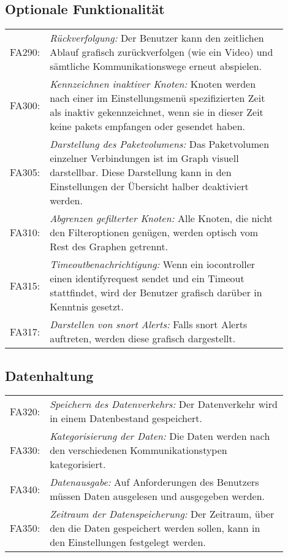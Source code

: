\subsection{Optionale Funktionalität}
\begin{tabular}{lp{0.9\linewidth}}

FA290: & \textit{Rückverfolgung: }Der Benutzer kann den zeitlichen Ablauf grafisch zurückverfolgen (wie ein Video) und sämtliche Kommunikationswege erneut abspielen. \\

FA300: & \textit{Kennzeichnen inaktiver Knoten: }Knoten werden nach einer im Einstellungsmenü spezifizierten Zeit als inaktiv gekennzeichnet, wenn sie in dieser Zeit keine \glspl{paket} empfangen oder gesendet haben. \\

FA305: & \textit{Darstellung des Paketvolumens: }Das Paketvolumen einzelner Verbindungen ist im Graph visuell darstellbar. Diese Darstellung kann in den Einstellungen der Übersicht halber deaktiviert werden. \\

FA310: & \textit{Abgrenzen gefilterter Knoten: }Alle Knoten, die nicht den Filteroptionen genügen, werden optisch vom Rest des Graphen getrennt. \\

FA315: & \textit{Timeoutbenachrichtigung: }Wenn ein \gls{iocontroller} einen \gls{identifyrequest} sendet und ein Timeout stattfindet, wird der Benutzer grafisch darüber in Kenntnis gesetzt.\\

FA317: & \textit{Darstellen von \gls{snort} Alerts: }Falls \gls{snort} Alerts auftreten, werden diese grafisch dargestellt.

\end{tabular}

\subsection{Datenhaltung}

\begin{tabular}{lp{0.9\linewidth}}

FA320: & \textit{Speichern des Datenverkehrs: }Der Datenverkehr wird in einem Datenbestand gespeichert. \\

FA330: & \textit{Kategorisierung der Daten: }Die Daten werden nach den verschiedenen Kommunikationstypen kategorisiert. \\

FA340: & \textit{Datenausgabe: }Auf Anforderungen des Benutzers müssen Daten ausgelesen und ausgegeben werden. \\

FA350: & \textit{Zeitraum der Datenspeicherung: }Der Zeitraum, über den die Daten gespeichert werden sollen, kann in den Einstellungen festgelegt werden. \\

\end{tabular}

